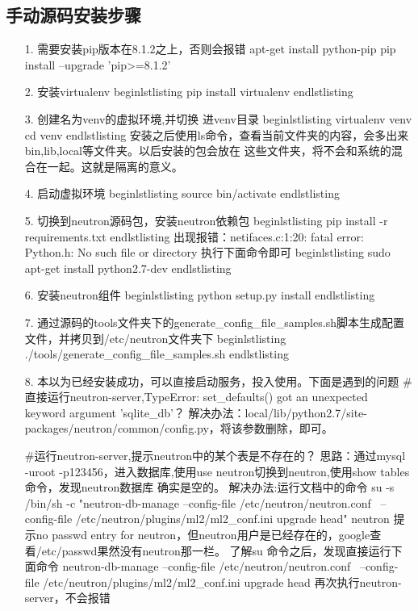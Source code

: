 \documentclass[a4paper,left=1.5cm,right=1.5cm,11pt]{article}
\begin{document}
\subsection{手动源码安装步骤}
    \begin{itemize}
		\item[1.]需要安装pip版本在8.1.2之上，否则会报错
			apt-get install python-pip
			pip install --upgrade 'pip>=8.1.2'
		\item[2.]安装virtualenv
			begin{lstlisting}
				pip install virtualenv
			end{lstlisting}
		\item[3.]创建名为venv的虚拟环境,并切换	进venv目录
			begin{lstlisting}
				virtualenv venv
				cd venv
			end{lstlisting}
			安装之后使用ls命令，查看当前文件夹的内容，会多出来bin,lib,local等文件夹。以后安装的包会放在
			这些文件夹，将不会和系统的混合在一起。这就是隔离的意义。
		\item[4.]启动虚拟环境
			begin{lstlisting}
				source bin/activate
			end{lstlisting}
        \item[5.]切换到neutron源码包，安装neutron依赖包
			begin{lstlisting}
				pip install -r requirements.txt
			end{lstlisting}
			出现报错：netifaces.c:1:20: fatal error: Python.h: No such file or directory
			执行下面命令即可
			begin{lstlisting}
				sudo apt-get install python2.7-dev
			end{lstlisting}
		\item[6.]安装neutron组件
			begin{lstlisting}
				python setup.py install
			end{lstlisting}
		\item[7.]通过源码的tools文件夹下的generate\_config\_file\_samples.sh脚本生成配置文件，并拷贝到/etc/neutron文件夹下
			begin{lstlisting}
				./tools/generate_config_file_samples.sh
			end{lstlisting}	
		\item[8.]本以为已经安装成功，可以直接启动服务，投入使用。下面是遇到的问题
			#直接运行neutron-server,TypeError: set\_defaults() got an unexpected keyword argument 'sqlite_db'？
			解决办法：local/lib/python2.7/site-packages/neutron/common/config.py，将该参数删除，即可。

			#运行neutron-server,提示neutron中的某个表是不存在的？
			思路：通过mysql -uroot -p123456，进入数据库,使用use neutron切换到neutron,使用show tables命令，发现neutron数据库
			确实是空的。
			解决办法:运行文档中的命令
			su -s /bin/sh -c "neutron-db-manage --config-file /etc/neutron/neutron.conf \
			--config-file /etc/neutron/plugins/ml2/ml2\_conf.ini upgrade head" neutron
			提示no passwd entry for neutron，但neutron用户是已经存在的，google查看/etc/passwd果然没有neutron那一栏。
			了解su 命令之后，发现直接运行下面命令
			neutron-db-manage --config-file /etc/neutron/neutron.conf \
			--config-file /etc/neutron/plugins/ml2/ml2\_conf.ini upgrade head
			再次执行neutron-server，不会报错


\end{itemize}
\end{document}
